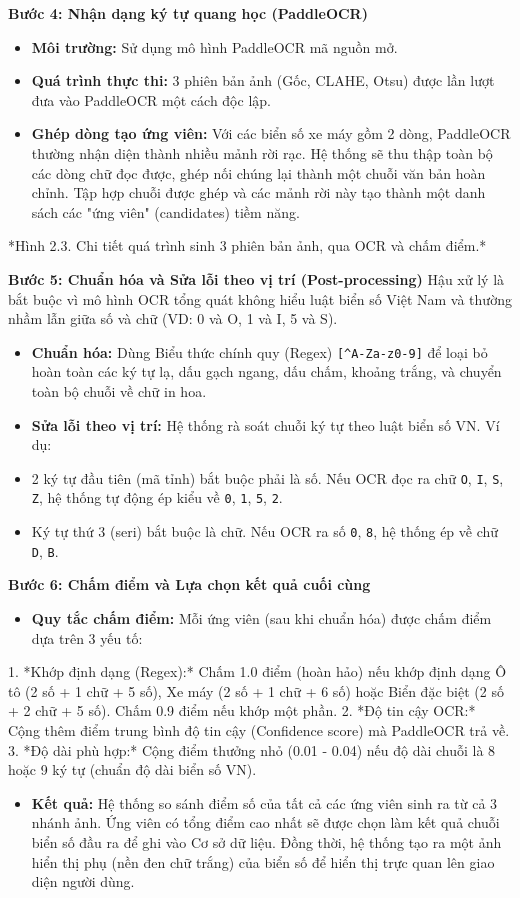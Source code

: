 \documentclass[a4paper,14pt]{extreport}
\begin{document}
\textbf{Bước 4: Nhận dạng ký tự quang học (PaddleOCR)}
\begin{itemize}[leftmargin=2em]
  \item \textbf{Môi trường:} Sử dụng mô hình PaddleOCR mã nguồn mở.
  \item \textbf{Quá trình thực thi:} 3 phiên bản ảnh (Gốc, CLAHE, Otsu) được lần lượt đưa vào PaddleOCR một cách độc lập.
  \item \textbf{Ghép dòng tạo ứng viên:} Với các biển số xe máy gồm 2 dòng, PaddleOCR thường nhận diện thành nhiều mảnh rời rạc. Hệ thống sẽ thu thập toàn bộ các dòng chữ đọc được, ghép nối chúng lại thành một chuỗi văn bản hoàn chỉnh. Tập hợp chuỗi được ghép và các mảnh rời này tạo thành một danh sách các "ứng viên" (candidates) tiềm năng.
\end{itemize}
*Hình 2.3. Chi tiết quá trình sinh 3 phiên bản ảnh, qua OCR và chấm điểm.*

\textbf{Bước 5: Chuẩn hóa và Sửa lỗi theo vị trí (Post-processing)}
Hậu xử lý là bắt buộc vì mô hình OCR tổng quát không hiểu luật biển số Việt Nam và thường nhầm lẫn giữa số và chữ (VD: 0 và O, 1 và I, 5 và S).
\begin{itemize}[leftmargin=2em]
  \item \textbf{Chuẩn hóa:} Dùng Biểu thức chính quy (Regex) \texttt{[^A-Za-z0-9]} để loại bỏ hoàn toàn các ký tự lạ, dấu gạch ngang, dấu chấm, khoảng trắng, và chuyển toàn bộ chuỗi về chữ in hoa.
  \item \textbf{Sửa lỗi theo vị trí:} Hệ thống rà soát chuỗi ký tự theo luật biển số VN. Ví dụ:
  \item 2 ký tự đầu tiên (mã tỉnh) bắt buộc phải là số. Nếu OCR đọc ra chữ \texttt{O}, \texttt{I}, \texttt{S}, \texttt{Z}, hệ thống tự động ép kiểu về \texttt{0}, \texttt{1}, \texttt{5}, \texttt{2}.
  \item Ký tự thứ 3 (seri) bắt buộc là chữ. Nếu OCR ra số \texttt{0}, \texttt{8}, hệ thống ép về chữ \texttt{D}, \texttt{B}.
\end{itemize}
\textbf{Bước 6: Chấm điểm và Lựa chọn kết quả cuối cùng}
\begin{itemize}[leftmargin=2em]
  \item \textbf{Quy tắc chấm điểm:} Mỗi ứng viên (sau khi chuẩn hóa) được chấm điểm dựa trên 3 yếu tố:
\end{itemize}
  1. *Khớp định dạng (Regex):* Chấm 1.0 điểm (hoàn hảo) nếu khớp định dạng Ô tô (2 số + 1 chữ + 5 số), Xe máy (2 số + 1 chữ + 6 số) hoặc Biển đặc biệt (2 số + 2 chữ + 5 số). Chấm 0.9 điểm nếu khớp một phần.
  2. *Độ tin cậy OCR:* Cộng thêm điểm trung bình độ tin cậy (Confidence score) mà PaddleOCR trả về.
  3. *Độ dài phù hợp:* Cộng điểm thưởng nhỏ (0.01 - 0.04) nếu độ dài chuỗi là 8 hoặc 9 ký tự (chuẩn độ dài biển số VN).
\begin{itemize}[leftmargin=2em]
  \item \textbf{Kết quả:} Hệ thống so sánh điểm số của tất cả các ứng viên sinh ra từ cả 3 nhánh ảnh. Ứng viên có tổng điểm cao nhất sẽ được chọn làm kết quả chuỗi biển số đầu ra để ghi vào Cơ sở dữ liệu. Đồng thời, hệ thống tạo ra một ảnh hiển thị phụ (nền đen chữ trắng) của biển số để hiển thị trực quan lên giao diện người dùng.
\end{itemize}
\end{document}
